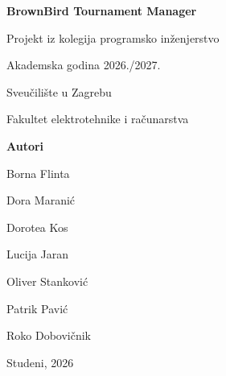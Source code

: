\begin{titlepage}
    \centering

    \vspace*{5cm}

    {\Huge\bfseries BrownBird Tournament Manager\par}

    \vspace{1cm}

    {\Large Projekt iz kolegija programsko inženjerstvo\par}
    {\Large Akademska godina 2026./2027.\par}

    \vspace{0.5cm}

    {\Large Sveučilište u Zagrebu\par}
    {\Large Fakultet elektrotehnike i računarstva\par}

    \vspace{2cm}

    {\large\bfseries Autori\par}

    \vspace{0.5cm}

    {\large Borna Flinta\par}
    {\large Dora Maranić\par}
    {\large Dorotea Kos\par}
    {\large Lucija Jaran\par}
    {\large Oliver Stanković\par}
    {\large Patrik Pavić\par}
    {\large Roko Dobovičnik\par}

    \vfill

    {\large Studeni, 2026\par}

\end{titlepage}
